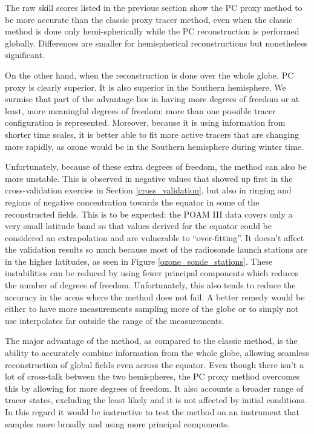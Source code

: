 The raw skill scores listed in the previous section show the PC proxy method
to be more accurate than the classic proxy tracer method, even when the classic
method is done only hemi-spherically while the PC reconstruction is
performed globally.
Differences are smaller for hemispherical reconstructions but nonetheless
significant.

On the other hand, when the reconstruction is done over the whole globe,
PC proxy is clearly superior.
It is also superior in the Southern hemisphere.
We surmise that part of the advantage lies in having more degrees of freedom
or at least, more meaningful degrees of freedom: more than one possible
tracer configuration is represented.
Moreover, because it is using information from shorter time scales, it
is better able to fit more active tracers that are changing more rapidly,
as ozone would be in the Southern hemisphere during winter time.

Unfortunately, because of these extra degrees of freedom, the method can also
be more unstable.
This is observed in negative values that showed up first in the cross-validation
exercise in Section \ref{cross_validation}, but also in ringing and regions
of negative concentration towards the equator in some of the reconstructed
fields.
This is to be expected: the POAM III data covers only a very small latitude 
band so that values derived for the equator could be considered an
extrapolation and are vulnerable to ``over-fitting''.
It doesn't affect the validation results so much because most of the 
radiosonde launch stations are in the higher latitudes, as seen in
Figure \ref{ozone_sonde_stations}.
These instabilities can be reduced by using fewer principal components which
reduces the number of degrees of freedom.
Unfortunately, this also tends to reduce the accuracy in the areas where the
method does not fail.
A better remedy would be either to have more measurements sampling more of
the globe or to simply not use interpolates far outside the range of the
measurements.

The major advantage of the method, as compared to the classic method, 
is the ability to accurately combine information from the whole
globe, allowing seamless reconstruction of global fields even across the 
equator. 
Even though there isn't a lot of cross-talk between the two hemispheres, the
PC proxy method overcomes this by allowing for more degrees of freedom.
It also accounts a broader range of tracer states, excluding the least likely
and it is not affected by initial conditions.
In this regard
it would be instructive to test the method on an instrument that samples
more broadly and using more principal components.

